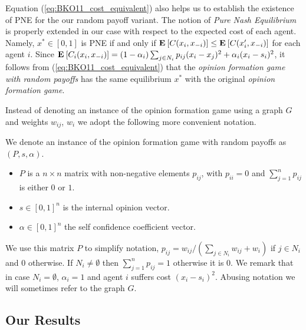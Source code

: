 Equation (\ref{eq:BKO11_cost_equivalent}) also helps us to establish the existence of PNE for the our random payoff variant.
The notion of \emph{Pure Nash Equilibrium} is properly extended in our case with respect to the expected cost of each agent. Namely, 
$x^* \in [0,1]$ is PNE if and only if $\Exp{C(x_i, x_{-i})} \leq \Exp{C(x_i', x_{-i})}$ 
for each agent $i$. Since $\bm{\mathrm{E}}_{} \left[ C_i(x_i,x_{-i}) \right]=(1-\alpha_i)\sum_{j \in N_i}p_{ij}(x_i-x_j)^2 + \alpha_i(x_i-s_i)^2$, 
it follows from (\ref{eq:BKO11_cost_equivalent}) that the \emph{opinion formation game with random payoffs} has the same equilibrium $x^*$ with 
the original \emph{opinion formation game}.

Instead of denoting an instance of the opinion formation game using a graph $G$
and weights $w_{ij}$, $w_i$ we adopt the following more convenient notation.

\begin{definition}\label{d:random_payof_game_instance}
We denote an instance of the opinion formation game with random payoffs as $(P,s,\alpha)$.
\begin{itemize}
 \item $P$ is a $n \times n$  matrix with non-negative elements $p_{ij}$,
  with $p_{ii}=0$ and $\sum_{j=1}^n p_{ij}$ is either $0$ or $1$.
 \item $s \in [0,1]^n$ is the internal opinion vector.
 \item $\alpha \in [0,1]^n$ the self confidence coefficient vector.
 \end{itemize}
\end{definition}
We use this matrix $P$ to simplify notation, $p_{ij} = w_{ij}/(\sum_{j \in N_i}w_{ij}+w_i)$ if $j \in N_i$ and $0$ otherwise.
If $N_i \neq \emptyset$ then $\sum_{j=1}^n p_{ij}=1$ otherwise it is $0$. We remark that in case $N_i=\emptyset$, $\alpha_i=1$
and agent $i$ suffers cost $(x_i-s_i)^2$.
Abusing notation we will sometimes refer to the graph $G$.


\subsection{Our Results}

